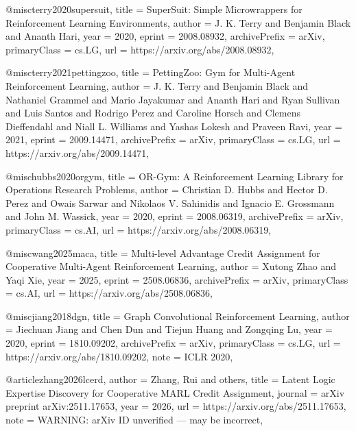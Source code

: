@misc{terry2020supersuit,
  title         = {{SuperSuit}: Simple Microwrappers for Reinforcement Learning Environments},
  author        = {J. K. Terry and Benjamin Black and Ananth Hari},
  year          = {2020},
  eprint        = {2008.08932},
  archivePrefix = {arXiv},
  primaryClass  = {cs.LG},
  url           = {https://arxiv.org/abs/2008.08932},
}

@misc{terry2021pettingzoo,
  title         = {{PettingZoo}: Gym for Multi-Agent Reinforcement Learning},
  author        = {J. K. Terry and Benjamin Black and Nathaniel Grammel and Mario Jayakumar and Ananth Hari and Ryan Sullivan and Luis Santos and Rodrigo Perez and Caroline Horsch and Clemens Dieffendahl and Niall L. Williams and Yashas Lokesh and Praveen Ravi},
  year          = {2021},
  eprint        = {2009.14471},
  archivePrefix = {arXiv},
  primaryClass  = {cs.LG},
  url           = {https://arxiv.org/abs/2009.14471},
}

@misc{hubbs2020orgym,
  title         = {{OR-Gym}: A Reinforcement Learning Library for Operations Research Problems},
  author        = {Christian D. Hubbs and Hector D. Perez and Owais Sarwar and Nikolaos V. Sahinidis and Ignacio E. Grossmann and John M. Wassick},
  year          = {2020},
  eprint        = {2008.06319},
  archivePrefix = {arXiv},
  primaryClass  = {cs.AI},
  url           = {https://arxiv.org/abs/2008.06319},
}

@misc{wang2025maca,
  title         = {Multi-level Advantage Credit Assignment for Cooperative Multi-Agent Reinforcement Learning},
  author        = {Xutong Zhao and Yaqi Xie},
  year          = {2025},
  eprint        = {2508.06836},
  archivePrefix = {arXiv},
  primaryClass  = {cs.AI},
  url           = {https://arxiv.org/abs/2508.06836},
}

@misc{jiang2018dgn,
  title         = {Graph Convolutional Reinforcement Learning},
  author        = {Jiechuan Jiang and Chen Dun and Tiejun Huang and Zongqing Lu},
  year          = {2020},
  eprint        = {1810.09202},
  archivePrefix = {arXiv},
  primaryClass  = {cs.LG},
  url           = {https://arxiv.org/abs/1810.09202},
  note          = {ICLR 2020},
}

@article{zhang2026lcerd,
  author  = {Zhang, Rui and others},
  title   = {Latent Logic Expertise Discovery for Cooperative {MARL} Credit Assignment},
  journal = {arXiv preprint arXiv:2511.17653},
  year    = {2026},
  url     = {https://arxiv.org/abs/2511.17653},
  note    = {WARNING: arXiv ID unverified --- may be incorrect},
}

